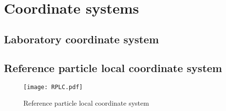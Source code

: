 \graphicspath{ {02-CoordinateSystems/Figures/} }

\section{Coordinate systems}

\subsection{Laboratory coordinate system}

\subsection{Reference particle local coordinate system}

\begin{figure}
  \begin{center}
    \texttt{[image: RPLC.pdf]}
  \end{center}
  \caption{
    Reference particle local coordinate system
  }
\end{figure}
